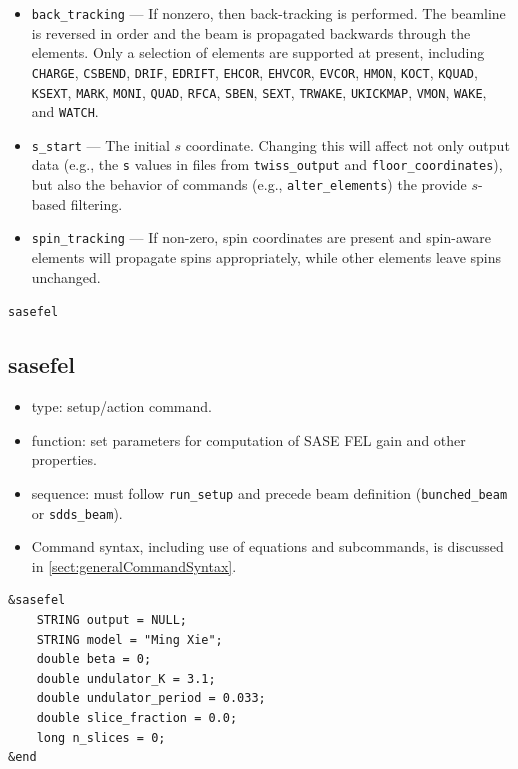 \documentclass[11pt]{article}
\begin{document}
\begin{itemize}
\item \verb|back_tracking| --- If nonzero, then back-tracking is performed. The beamline is reversed in
  order and the beam is propagated backwards through the elements. Only a selection of elements are supported at
  present, including \verb|CHARGE|, \verb|CSBEND|, \verb|DRIF|, \verb|EDRIFT|, \verb|EHCOR|, \verb|EHVCOR|,
  \verb|EVCOR|, \verb|HMON|, \verb|KOCT|, \verb|KQUAD|, \verb|KSEXT|, \verb|MARK|, \verb|MONI|, \verb|QUAD|, \verb|RFCA|, 
  \verb|SBEN|, \verb|SEXT|, \verb|TRWAKE|, \verb|UKICKMAP|, \verb|VMON|, \verb|WAKE|, and \verb|WATCH|.
\item \verb|s_start| --- The initial $s$ coordinate. Changing this will affect not only output data (e.g., the \verb|s|
  values in files from \verb|twiss_output| and \verb|floor_coordinates|), but also the behavior of commands (e.g., \verb|alter_elements|)
  the provide $s$-based filtering.
\item \verb|spin_tracking| --- If non-zero, spin coordinates are present and spin-aware elements will propagate spins appropriately, while
  other elements leave spins unchanged.
\end{itemize}

\newpage
\begin{center}{\Large\verb|sasefel|}\end{center}
\subsection{sasefel \label{subsec:sasefel}}

\begin{itemize}
\item type: setup/action command.
\item function: set parameters for computation of SASE FEL gain and other properties.
\item sequence: must follow \verb|run_setup| and precede beam definition (\verb|bunched_beam| or \verb|sdds_beam|).
\item Command syntax, including use of equations and subcommands, is discussed in \ref{sect:generalCommandSyntax}.
\end{itemize}

\begin{verbatim}
&sasefel
    STRING output = NULL;
    STRING model = "Ming Xie";
    double beta = 0;
    double undulator_K = 3.1;
    double undulator_period = 0.033;
    double slice_fraction = 0.0;
    long n_slices = 0;
&end
\end{verbatim}
\end{document}
